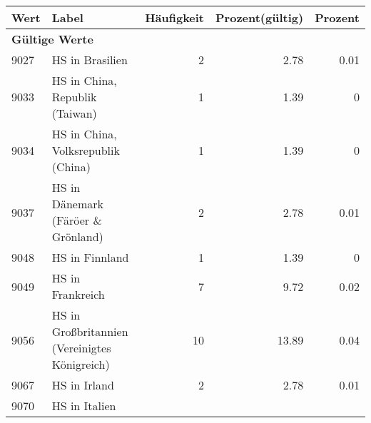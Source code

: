      \begin{longtable}{lXrrr}
     \toprule
     \textbf{Wert} & \textbf{Label} & \textbf{Häufigkeit} & \textbf{Prozent(gültig)} & \textbf{Prozent} \\
     \endhead
     \midrule
     \multicolumn{5}{l}{\textbf{Gültige Werte}}\\
        9027 & \multicolumn{1}{X}{HS in Brasilien} & %
          \num{2} &
          \num[round-mode=places,round-precision=2]{2.78} &
          \num[round-mode=places,round-precision=2]{0.01} \\
        9033 & \multicolumn{1}{X}{HS in China, Republik (Taiwan)} & %
          \num{1} &
          \num[round-mode=places,round-precision=2]{1.39} &
          \num[round-mode=places,round-precision=2]{0} \\
        9034 & \multicolumn{1}{X}{HS in China, Volksrepublik (China)} & %
          \num{1} &
          \num[round-mode=places,round-precision=2]{1.39} &
          \num[round-mode=places,round-precision=2]{0} \\
        9037 & \multicolumn{1}{X}{HS in Dänemark (Färöer \& Grönland)} & %
          \num{2} &
          \num[round-mode=places,round-precision=2]{2.78} &
          \num[round-mode=places,round-precision=2]{0.01} \\
        9048 & \multicolumn{1}{X}{HS in Finnland} & %
          \num{1} &
          \num[round-mode=places,round-precision=2]{1.39} &
          \num[round-mode=places,round-precision=2]{0} \\
        9049 & \multicolumn{1}{X}{HS in Frankreich} & %
          \num{7} &
          \num[round-mode=places,round-precision=2]{9.72} &
          \num[round-mode=places,round-precision=2]{0.02} \\
        9056 & \multicolumn{1}{X}{HS in Großbritannien (Vereinigtes Königreich)} & %
          \num{10} &
          \num[round-mode=places,round-precision=2]{13.89} &
          \num[round-mode=places,round-precision=2]{0.04} \\
        9067 & \multicolumn{1}{X}{HS in Irland} & %
          \num{2} &
          \num[round-mode=places,round-precision=2]{2.78} &
          \num[round-mode=places,round-precision=2]{0.01} \\
        9070 & \multicolumn{1}{X}{HS in Italien} & %

\end{longtable}
